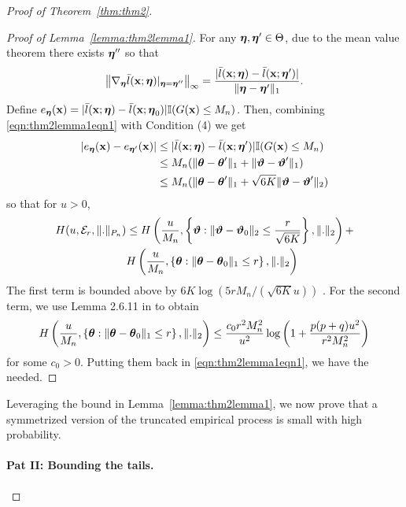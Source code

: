 \documentclass[11pt,letterpaper]{article}
\numberwithin{equation}{section}
\begin{document}
\begin{proof}[Proof of Theorem~\ref{thm:thm2}]
\begin{proof}[Proof of Lemma~\ref{lemma:thm2lemma1}]
For any ${\boldsymbol{\eta}}, {\boldsymbol{\eta}}' \in \Theta$, due to the mean value theorem there exists ${\boldsymbol{\eta}}''$ so that
%
\begin{align}\label{eqn:thm2lemma1eqn1}
\left\| \nabla_{\boldsymbol{\eta}} \bar l({\bf{x}}; {\boldsymbol{\eta}})|_{{\boldsymbol{\eta}} = {\boldsymbol{\eta}}''} \right\|_\infty =
\frac{| \bar l({\bf{x}}; {\boldsymbol{\eta}}) -  \bar l({\bf{x}}; {\boldsymbol{\eta}}')|}{\| {\boldsymbol{\eta}} - {\boldsymbol{\eta}}'\|_1}.
\end{align}
%
Define $e_{\boldsymbol{\eta}}({\bf{x}}) = | \bar l({\bf{x}}; {\boldsymbol{\eta}}) -  \bar l({\bf{x}}; {\boldsymbol{\eta}}_0)| {\mathbb{I}}(G({\bf{x}}) \leq M_n)$. Then, combining \eqref{eqn:thm2lemma1eqn1} with Condition (4) we get
%
\begin{align*}
| e_{\boldsymbol{\eta}} ({\bf{x}}) - e_{{\boldsymbol{\eta}}'} ({\bf{x}}) | & \leq | \bar l({\bf{x}}; {\boldsymbol{\eta}}) -  \bar l({\bf{x}}; {\boldsymbol{\eta}}')| {\mathbb{I}}(G({\bf{x}}) \leq M_n)\\
& \leq M_n( \| {\boldsymbol{\theta}} - {\boldsymbol{\theta}}'\|_1 + \| {\boldsymbol{\vartheta}} - {\boldsymbol{\vartheta}}' \|_1)\\
& \leq M_n( \| {\boldsymbol{\theta}} - {\boldsymbol{\theta}}'\|_1 + \sqrt{6K} \| {\boldsymbol{\vartheta}} - {\boldsymbol{\vartheta}}' \|_2)
\end{align*}
%
so that for $u > 0$,
%
\begin{align}
H(u, {\cal{E}}_r, \|.\|_{P_n}) & \leq
H\left( \frac{u}{M_n}, \left\{ {\boldsymbol{\vartheta}}: \| {\boldsymbol{\vartheta}} - {\boldsymbol{\vartheta}}_0 \|_2 \leq \frac{r}{\sqrt{6K}} \right\}, \|.\|_2 \right) + \notag\\
& H\left( \frac{u}{M_n}, \left\{{\boldsymbol{\theta}}: \| {\boldsymbol{\theta}} - {\boldsymbol{\theta}}_0 \|_1 \leq r \right\} , \|.\|_2 \right) 
\end{align}
%
The first term is bounded above by $6K \log(5r M_n/(\sqrt{6K}u))$ \citep{StadlerEtal10}. For the second term, we use Lemma 2.6.11 in \cite{vdvWellnerBook96} to obtain
%
$$
H\left( \frac{u}{M_n}, \left\{{\boldsymbol{\theta}}: \| {\boldsymbol{\theta}} - {\boldsymbol{\theta}}_0 \|_1 \leq r \right\} , \|.\|_2 \right) \leq
\frac{ c_0 r^2 M_n^2}{u^2} \log \left(1 + \frac{p(p+q) u^2}{r^2 M_n^2} \right)
$$
%
for some $c_0 > 0$. Putting them back in \eqref{eqn:thm2lemma1eqn1}, we have the needed.
\end{proof}

Leveraging the bound in Lemma~\ref{lemma:thm2lemma1}, we now prove that a symmetrized version of the truncated empirical process is small with high probability.

\paragraph{Pat II: Bounding the tails.}
\end{proof}




\end{document}
